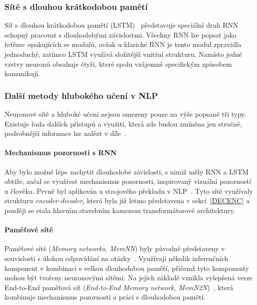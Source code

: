 \subsubsection{Sítě s dlouhou krátkodobou pamětí}
Síť s dlouhou krátkodobou pamětí (LSTM)~\cite{LSTMbib} představuje speciální druh RNN schopný pracovat s dlouhodobými závislostmi. Všechny RNN lze popsat jako řetězec opakujících se modulů, avšak u klasické RNN je tento modul zpravidla jednoduchý, zatímco LSTM využívá složitější vnitřní strukturu. Namísto jedné vrstvy neuronů obsahuje čtyři, které spolu vzájemně specifickým způsobem komunikují.~\cite{zhang2018deeplearningsentimentanalysis}

\subsubsection{Další metody hlubokého učení v NLP}
Neuronové sítě a hluboké učení nejsou omezeny pouze na výše popsané tři typy. Existuje řada dalších přístupů a využití, která zde budou zmíněna jen stručně, podrobnější informace lze nalézt v díle~\cite{zhang2018deeplearningsentimentanalysis}.

\paragraph{Mechanismus pozornosti s RNN}
Aby bylo možné lépe zachytit dlouhodobé závislosti, s nimiž měly RNN a LSTM obtíže, začal se využívat mechanismus pozornosti, inspirovaný vizuální pozorností u člověka. Prvně byl aplikován u strojového překladu v NLP~\cite{bahdanau2016neuralmachinetranslationjointly}. Tyto sítě využívaly strukturu \emph{encoder-decoder}, která byla již letmo představena v sekci~\ref{DECENC} a později se stala hlavním stavebním kamenem transformátorové architektury.~\cite{zhang2018deeplearningsentimentanalysis}

\paragraph{Paměťové sítě}
Paměťové sítě (\emph{Memory networks, MemNN}) byly původně představeny v souvislosti s úlohou odpovídání na otázky~\cite{weston2015memorynetworks}. Využívají několik inferenčních komponent v kombinaci s velkou dlouhodobou pamětí, přičemž tyto komponenty mohou být tvořeny neuronovými sítěmi. Na jejich základě vznikla vylepšená verze End-to-End paměťová síť (\emph{End-to-End Memory network, MemN2N})~\cite{sukhbaatar2015endtoendmemorynetworks}, která kombinuje mechanismus pozornosti a práci s dlouhodobou pamětí.~\cite{zhang2018deeplearningsentimentanalysis}

